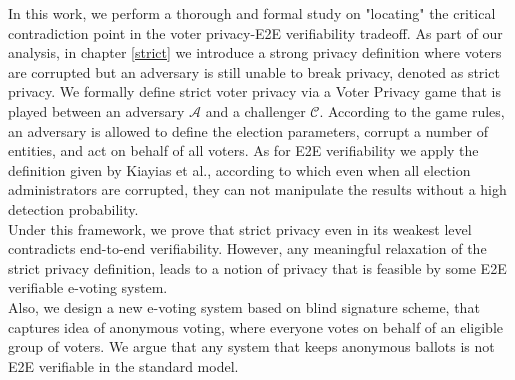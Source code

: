 In this work, we perform a thorough and formal study on "locating" the critical contradiction point in the voter privacy-E2E verifiability tradeoff.  As part of our analysis, in chapter  \ref{strict} we introduce a strong privacy definition where voters are corrupted but an adversary is still unable to break privacy, denoted as strict privacy. We formally define strict voter privacy via a Voter Privacy game that is played between an adversary $\mathcal{A}$ and a challenger $\mathcal{C}$. According to the game rules, an adversary is allowed to define the election parameters, corrupt a number of entities, and act on behalf of all voters. As for E2E verifiability we apply the definition given by Kiayias et al., according to which even when all election administrators are corrupted, they can not manipulate the results without a high detection probability.\\

Under this framework, we prove that strict privacy even in its weakest level contradicts end-to-end verifiability. However, any meaningful relaxation of the strict privacy definition, leads to a notion of privacy that is feasible by some E2E verifiable e-voting system. \\

Also, we design a new e-voting system based on blind signature scheme, that captures idea of anonymous voting, where everyone votes on behalf of an eligible group of voters. We argue that any system that keeps anonymous ballots is not E2E verifiable in the standard model. 